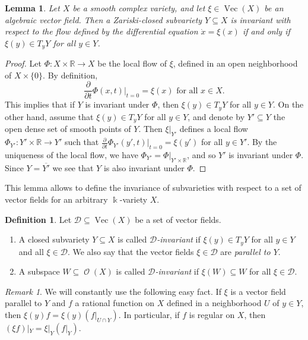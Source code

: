 \documentclass{amsart}
\newtheorem{lem}[thm]{Lemma}
\theoremstyle{definition}
\newtheorem{defn}[thm]{Definition}
\theoremstyle{remark}
\newtheorem{rem}[thm]{Remark}
\begin{document}
\begin{lem}
Let $X$ be a smooth complex variety, and let $\xi \in \operatorname{Vec}(X)$ be an algebraic vector field. Then a Zariski-closed subvariety $Y {\subseteq} X$ is invariant with respect to the flow defined by the differential equation $\dot x = \xi(x)$ if and only if $\xi(y) \in T_{y}Y$ for all $y \in Y$.
\end{lem}
\begin{proof}
Let $\Phi\colon X \times {\mathbb R} \to X$ be the local flow of $\xi$, defined in an open neighborhood of $X \times \{0\}$. By definition, 
$$
\frac{\partial }{\partial t} \Phi(x,t)|_{t=0} = \xi(x) \text{ for all } x \in X.
$$
This implies that if $Y$ is invariant under $\Phi$, then $\xi(y) \in T_{y}Y$ for all $y \in Y$. On the other hand, assume that $\xi(y) \in T_{y}Y$ for all $y \in Y$, and denote by $Y' {\subseteq} Y$ the open dense set of smooth points of $Y$. Then $\xi|_{Y'}$ defines a local flow $\Phi_{Y'}\colon Y' \times {\mathbb R} \to Y'$ such that $\frac{\partial }{\partial t} \Phi_{Y'}(y',t)|_{t=0} = \xi(y')$ for  all  $y \in Y'$. By the uniqueness of the local flow, we have $\Phi_{Y'} = \Phi|_{Y' \times {\mathbb R}}$, and so $Y'$ is invariant under $\Phi$. Since $Y = \overline{Y'}$ we see that $Y$ is also invariant under $\Phi$.
\end{proof}
This lemma allows to define the invariance of subvarieties with respect to a set of vector fields for an arbitrary ${\Bbbk}$-variety $X$.
\begin{defn}
Let ${\mathcal D} {\subseteq} \operatorname{Vec}(X)$ be a set of vector fields. 
\begin{enumerate}
\item
A closed subvariety $Y {\subseteq} X$ is called {\it ${\mathcal D}$-invariant\/} if $\xi(y)\in T_{y}Y$ for all $y\in Y$ and all $\xi \in {\mathcal D}$. We also say that the vector fields $\xi \in {\mathcal D}$ are {\it parallel to $Y$}.
\item
A subspace $W {\subseteq} \operatorname{\mathcal O}(X)$ is called {\it ${\mathcal D}$-invariant} if $\xi(W) {\subseteq} W$ for all $\xi \in {\mathcal D}$.
\end{enumerate}
\end{defn}
\begin{rem} 
We will constantly use the following easy fact. If $\xi$ is a vector field parallel to $Y$ and $f$  a rational function on $X$ defined in a neighborhood $U$ of $y \in Y$, then $\xi(y) f = \xi(y) (f|_{U\cap Y})$. In particular, if $f$ is regular on $X$, then $(\xi f)|_{Y}=\xi|_{Y} (f|_{Y})$.
\end{rem} 
\end{document}
